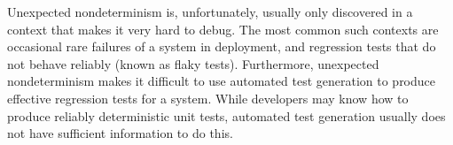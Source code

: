 \begin{comment} in general, if the operating system
itself is not buggy, low-level nondeterminism, by design, is invisible
except in fine-grained performance testing or real-time systems.
Unexpected nondeterminism usually arises when there is an element of higher-level
state or input that \emph{is} critical to the produced behavior, but
the programmer has not anticipated.  E.g.,  when it is believed that the
behavior of a thread scheduler will not matter, but a race condition
in the code means that it does matter, or when the order of items in
an iterator on a hash table is important, and the hash values used are
randomly salted.
\end{comment}


Unexpected nondeterminism is, unfortunately, usually only discovered
in a context that makes it very hard to debug.   The most common such
contexts are occasional rare failures of a system in deployment, and
regression tests that do not behave reliably (known as flaky tests).
Furthermore, unexpected nondeterminism makes it difficult to use
automated test generation to produce effective regression tests for a
system.  While developers may know how to produce reliably
deterministic unit tests, automated test generation usually does not
have sufficient information to do this.


